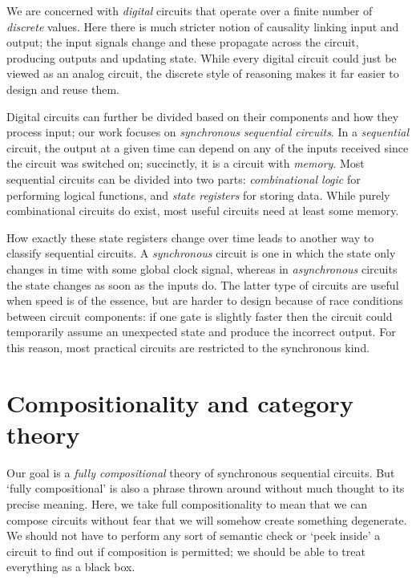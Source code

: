 We are concerned with \emph{digital} circuits that operate over a finite
number of \emph{discrete} values.
Here there is much stricter notion of causality linking input and output; the
input signals change and these propagate across the circuit, producing outputs
and updating state.
While every digital circuit could just be viewed as an analog circuit, the
discrete style of reasoning makes it far easier to design and reuse them.

\begin{center}
\end{center}

Digital circuits can further be divided based on their components and how they
process input; our work focuses on \emph{synchronous sequential circuits}.
In a \emph{sequential} circuit, the output at a given time can depend on any of
the inputs received since the circuit was switched on; succinctly, it is a
circuit with \emph{memory}.
Most sequential circuits can be divided into two parts:
\emph{combinational logic} for performing logical functions, and
\emph{state registers} for storing data.
While purely combinational circuits do exist, most useful circuits need
at least some memory.

How exactly these state registers change over time leads to another way
to classify sequential circuits.
A \emph{synchronous} circuit is one in which the state only changes in time with
some global clock signal, whereas in \emph{asynchronous} circuits the state
changes as soon as the inputs do.
The latter type of circuits are useful when speed is of the essence, but are
harder to design because of race conditions between circuit components: if one
gate is slightly faster then the circuit could temporarily assume an unexpected
state and produce the incorrect output.
For this reason, most practical circuits are restricted to the synchronous
kind.

\section{Compositionality and category theory}

Our goal is a \emph{fully compositional} theory of synchronous sequential
circuits.
But `fully compositional' is also a phrase thrown around without much thought to
its precise meaning.
Here, we take full compositionality to mean that we can compose circuits
without fear that we will somehow create something degenerate.
We should not have to perform any sort of semantic check or `peek inside' a
circuit to find out if composition is permitted; we should be able to treat
everything as a black box.

